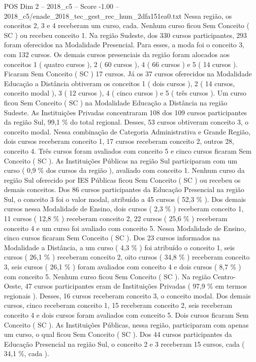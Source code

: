 \begin{textsample}{POS Dim 2 – 2018\_c5 – Score -1.00 – 2018\_c5/enade\_2018\_tec\_gest\_rec\_hum\_2dfa151ea0.txt}
Nessa região, os conceitos 2, 3 e 4 receberam um curso, cada.
Nenhum curso ficou Sem Conceito ( SC ) ou recebeu conceito 1.
Na região Sudeste, dos 330 cursos participantes, 293 foram oferecidos na Modalidade Presencial.
Para esses, a moda foi o conceito 3, com 132 cursos.
Os demais cursos presenciais da região foram alocados aos conceitos 1 ( quatro cursos ), 2 ( 60 cursos ), 4 ( 66 cursos ) e 5 ( 14 cursos ).
Ficaram Sem Conceito ( SC ) 17 cursos.
Já os 37 cursos oferecidos na Modalidade Educação a Distância obtiveram os conceitos 1 ( dois cursos ), 2 ( 14 cursos, conceito modal ), 3 ( 12 cursos ), 4 ( cinco cursos ) e 5 ( três cursos ).
Um curso ficou Sem Conceito ( SC ) na Modalidade Educação a Distância na região Sudeste.
As Instituições Privadas concentraram 108 dos 109 cursos participantes da região Sul, 99,1 \% do total regional.
Desses, 53 cursos obtiveram conceito 3, o conceito modal.
Nessa combinação de Categoria Administrativa e Grande Região, dois cursos receberam conceito 1, 17 cursos receberam conceito 2, outros 28, conceito 4.
Três cursos foram avaliados com conceito 5 e cinco cursos ficaram Sem Conceito ( SC ).
As Instituições Públicas na região Sul participaram com um curso ( 0,9 \% dos cursos da região ), avaliado com conceito 1.
Nenhum curso da região Sul oferecido por IES Públicas ficou Sem Conceito ( SC ) ou recebeu os demais conceitos.
Dos 86 cursos participantes da Educação Presencial na região Sul, o conceito 3 foi o valor modal, atribuído a 45 cursos ( 52,3 \% ).
Dos demais cursos nessa Modalidade de Ensino, dois cursos ( 2,3 \% ) receberam conceito 1, 11 cursos ( 12,8 \% ) receberam conceito 2, 22 cursos ( 25,6 \% ) receberam conceito 4 e um curso foi avaliado com conceito 5.
Nessa Modalidade de Ensino, cinco cursos ficaram Sem Conceito ( SC ).
Dos 23 cursos informados na Modalidade a Distância, a um curso ( 4,3 \% ) foi atribuído o conceito 1, seis cursos ( 26,1 \% ) receberam conceito 2, oito cursos ( 34,8 \% ) receberam conceito 3, seis cursos ( 26,1 \% ) foram avaliados com conceito 4 e dois cursos ( 8,7 \% ) com conceito 5.
Nenhum curso ficou Sem Conceito ( SC ).
Na região Centro-Oeste, 47 cursos participantes eram de Instituições Privadas ( 97,9 \% em termos regionais ).
Desses, 16 cursos receberam conceito 3, o conceito modal.
Dos demais cursos, cinco receberam conceito 1, 15 receberam conceito 2, seis receberam conceito 4 e dois cursos foram avaliados com conceito 5.
Dois cursos ficaram Sem Conceito ( SC ).
As Instituições Públicas, nessa região, participaram com apenas um curso, o qual ficou Sem Conceito ( SC ).
Dos 44 cursos participantes da Educação Presencial na região Sul, o conceito 2 e 3 receberam 15 cursos, cada ( 34,1 \%, cada ).

\end{textsample}
